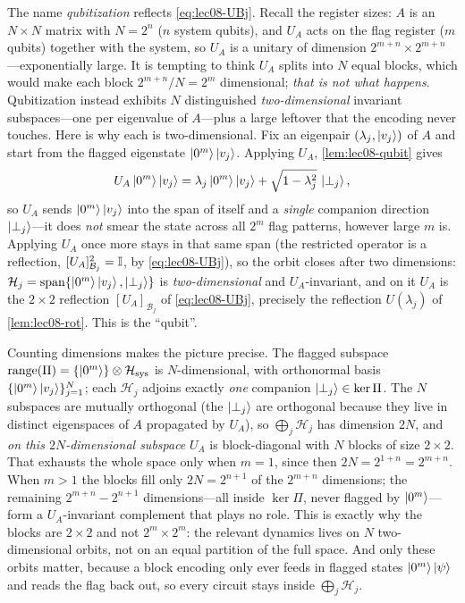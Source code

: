 The name \emph{qubitization} reflects \eqref{eq:lec08-UBj}. Recall the register sizes:
$A$ is an $N\times N$ matrix with $N=2^n$ ($n$ system qubits), and $U_A$ acts on the flag
register ($m$ qubits) together with the system, so $U_A$ is a unitary of dimension
$2^{m+n}\times 2^{m+n}$---exponentially large. It is tempting to think $U_A$ splits into
$N$ equal blocks, which would make each block $2^{m+n}/N=2^m$ dimensional; \emph{that is
not what happens}. Qubitization instead exhibits $N$ distinguished \emph{two-dimensional}
invariant subspaces---one per eigenvalue of $A$---plus a large leftover that the encoding
never touches. Here is why each is two-dimensional. Fix an eigenpair
$(\lambda_j,\ket{v_j})$ of $A$ and start from the flagged eigenstate
$\ket{0^m}\ket{v_j}$. Applying $U_A$, \cref{lem:lec08-qubit} gives
\[
  U_A\ket{0^m}\ket{v_j}=\lambda_j\ket{0^m}\ket{v_j}+\sqrt{1-\lambda_j^2}\,\ket{\perp_j},
\]
so $U_A$ sends $\ket{0^m}\ket{v_j}$ into the span of itself and a \emph{single} companion
direction $\ket{\perp_j}$---it does \emph{not} smear the state across all $2^m$ flag
patterns, however large $m$ is. Applying $U_A$ once more stays in that same span (the
restricted operator is a reflection, $[U_A]_{\mathcal B_j}^2=\mathbb{I}$, by
\eqref{eq:lec08-UBj}), so the orbit closes after two dimensions:
$\mathcal H_j=\operatorname{span}\{\ket{0^m}\ket{v_j},\ket{\perp_j}\}$ is
\emph{two-dimensional} and $U_A$-invariant, and on it $U_A$ is the $2\times2$ reflection
$[U_A]_{\mathcal B_j}$ of \eqref{eq:lec08-UBj}, precisely the reflection $U(\lambda_j)$ of
\cref{lem:lec08-rot}. This is the ``qubit''.

Counting dimensions makes the picture precise. The flagged subspace
$\operatorname{range}(\Pi)=\{\ket{0^m}\}\otimes\mathcal H_{\mathrm{sys}}$ is
$N$-dimensional, with orthonormal basis $\{\ket{0^m}\ket{v_j}\}_{j=1}^N$; each
$\mathcal H_j$ adjoins exactly \emph{one} companion $\ket{\perp_j}\in\ker\Pi$. The $N$
subspaces are mutually orthogonal (the $\ket{\perp_j}$ are orthogonal because they live in
distinct eigenspaces of $A$ propagated by $U_A$), so $\bigoplus_j\mathcal H_j$ has
dimension $2N$, and \emph{on this $2N$-dimensional subspace} $U_A$ is block-diagonal with
$N$ blocks of size $2\times2$. That exhausts the whole space only when $m=1$, since then
$2N=2^{1+n}=2^{m+n}$. When $m>1$ the blocks fill only $2N=2^{n+1}$ of the $2^{m+n}$
dimensions; the remaining $2^{m+n}-2^{n+1}$ dimensions---all inside $\ker\Pi$, never
flagged by $\ket{0^m}$---form a $U_A$-invariant complement that plays no role. This is
exactly why the blocks are $2\times2$ and not $2^m\times2^m$: the relevant dynamics lives
on $N$ two-dimensional orbits, not on an equal partition of the full space. And only these
orbits matter, because a block encoding only ever feeds in flagged states
$\ket{0^m}\ket\psi$ and reads the flag back out, so every circuit stays inside
$\bigoplus_j\mathcal H_j$.

